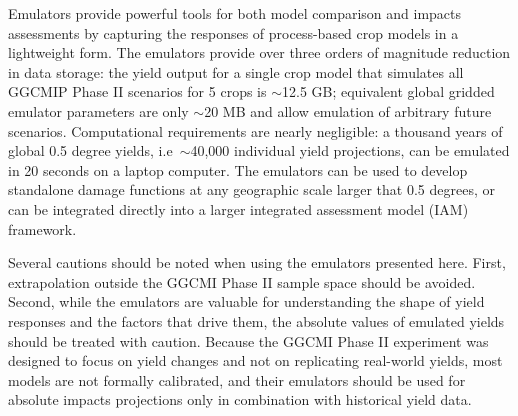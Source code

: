 \documentclass[gmd, manuscript]{copernicus} %
\begin{document}

Emulators provide powerful tools for both model comparison and impacts assessments by capturing the responses of process-based crop models in a lightweight form. The emulators provide over three orders of magnitude reduction in data storage: the yield output for a single crop model that simulates all GGCMIP Phase II scenarios for 5 crops is $\sim$12.5 GB; equivalent global gridded emulator parameters are only $\sim$20 MB and allow emulation of arbitrary future scenarios. Computational requirements are nearly negligible: a thousand years of global 0.5 degree yields, i.e\ $\sim$40,000 individual yield projections, can be emulated in 20 seconds on a laptop computer. 
The emulators can be used to develop standalone damage functions at any geographic scale larger that 0.5 degrees, or can be integrated directly into a larger integrated assessment model (IAM) framework. 

Several cautions should be noted when using the emulators presented here. 
First, extrapolation outside the GGCMI Phase II sample space should be avoided. %
Second, while the emulators are valuable for understanding the shape of yield responses and the factors that drive them, the absolute values of emulated yields should be treated with caution. Because the GGCMI Phase II experiment was designed to focus on yield changes and not on replicating real-world yields, most models are not formally calibrated, and their
emulators should be used for absolute impacts projections only in combination with historical yield data. 
\end{document}
